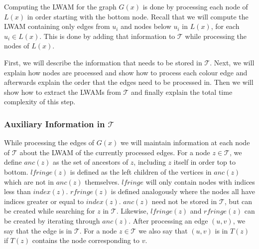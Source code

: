 Computing the LWAM for the graph $G(x)$ is done by processing each node of $L(x)$ in order starting with the bottom node. Recall that we will compute the LWAM containing only edges from $u_i$ and nodes below $u_i$ in $L(x)$, for each $u_i \in L(x)$. This is done by adding that information to $\mathcal{T}$ while processing the nodes of $L(x)$. 

First, we will describe the information that needs to be stored in $\mathcal{T}$. Next, we will explain how nodes are processed and show how to process each colour edge and afterwards explain the order that the edges need to be processed in. Then we will show how to extract the LWAMs from $\mathcal{T}$ and finally explain the total time complexity of this step.

\subsubsection{Auxiliary Information in $\mathcal{T}$}
While processing the edges of $G(x)$ we will maintain information at each node of $\mathcal{T}$ about the LWAM of the currently processed edges. For a node $z \in \mathcal{T}$, we define $anc(z)$ as the set of ancestors of $z$, including $z$ itself in order top to bottom. $lfringe(z)$ is defined as the left children of the vertices in $anc(z)$ which are not in $anc(z)$ themselves. $lfringe$ will only contain nodes with indices less than $index(z)$. $rfringe(z)$ is defined analogously where the nodes all have indices greater or equal to $index(z)$. $anc(z)$ need not be stored in $\mathcal{T}$, but can be created while searching for $z$ in $\mathcal{T}$. Likewise, $lfringe(z)$ and $rfringe(z)$ can be created by iterating through $anc(z)$. After processing an edge $(u,v)$, we say that the edge is in $\mathcal{T}$. For a node $z \in \mathcal{T}$ we also say that $(u,v)$ is in $T(z)$ if $T(z)$ contains the node corresponding to $v$.

